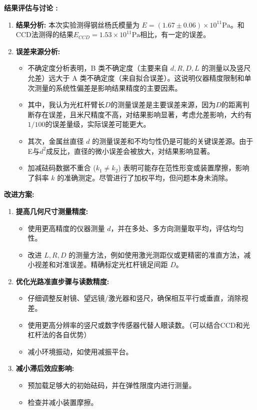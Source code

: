 \documentclass[12pt]{article}
\begin{document}
\textbf{结果评估与讨论 :}
\begin{enumerate}
    \item \textbf{结果分析:} 本次实验测得钢丝杨氏模量为 $E=(1.67\pm 0.06)\times 10^{11}\text{Pa}$。和CCD法测得的结果$E_{CCD}=1.53\times 10^{11}\text{Pa}$相比，有一定的误差。
    \item \textbf{误差来源分析:}
        \begin{itemize}
            \item 不确定度分析表明，B 类不确定度（主要来自 $d, R, D, L$ 的测量以及竖尺允差）远大于 A 类不确定度（来自拟合误差）。这说明仪器精度限制和单次测量的系统性偏差是影响结果精度的主要因素。
            \item 其中，我认为光杠杆臂长$D$的测量误差是主要误差来源，因为$D$的距离判断存在误差，且米尺精度不高，对结果影响显著，考虑允差影响，大约有$1/100$的误差量级，实际误差可能更大。
            \item 其次，金属丝直径 $d$ 的测量误差和不均匀性仍是可能的关键误差源。由于E与$d^2$成反比，直径的微小误差会被放大，对结果影响显著。
            \item 加减砝码数据不重合 ($k_1 \neq k_2$) 表明可能存在范性形变或装置摩擦，影响了斜率 $k$ 的准确测定。尽管进行了加权平均，但问题本身未消除。
        \end{itemize}
\end{enumerate}

\textbf{改进方案:}
\begin{enumerate}
    \item \textbf{提高几何尺寸测量精度:}
        \begin{itemize}
            \item 使用更高精度的仪器测量 $d$，并在多处、多方向测量取平均，评估均匀性。
            \item 改进 $L, R, D$ 的测量方法，例如使用激光测距仪或更精密的准直方法，减小视差和对准误差。精确标定光杠杆镜足间距 $D$。
        \end{itemize}
    \item \textbf{优化光路准直步骤与读数精度:}
        \begin{itemize}
            \item 仔细调整反射镜、望远镜/激光器和竖尺，确保相互平行或垂直，消除视差。
            \item 使用更高分辨率的竖尺或数字传感器代替人眼读数。（可以结合CCD和光杠杆法的各自优势）
            \item 减小环境振动，如使用减振平台。
        \end{itemize}
    \item \textbf{减小滞后效应影响:}
        \begin{itemize}
            \item 预加载足够大的初始砝码，并在弹性限度内进行测量。
            \item 检查并减小装置摩擦。
        \end{itemize}
\end{enumerate}
\end{document}

